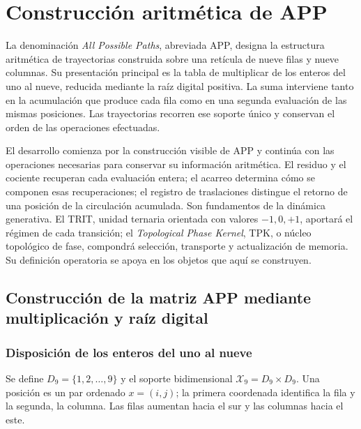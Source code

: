 \section{Construcción aritmética de APP}
\label{app:construccion-explicita}

La denominación \emph{All Possible Paths}, abreviada APP, designa la estructura aritmética de trayectorias construida sobre una retícula de nueve filas y nueve columnas. Su presentación principal es la tabla de multiplicar de los enteros del uno al nueve, reducida mediante la raíz digital positiva. La suma interviene tanto en la acumulación que produce cada fila como en una segunda evaluación de las mismas posiciones. Las trayectorias recorren ese soporte único y conservan el orden de las operaciones efectuadas.

El desarrollo comienza por la construcción visible de APP y continúa con las operaciones necesarias para conservar su información aritmética. El residuo y el cociente recuperan cada evaluación entera; el acarreo determina cómo se componen esas recuperaciones; el registro de traslaciones distingue el retorno de una posición de la circulación acumulada. Son fundamentos de la dinámica generativa. El TRIT, unidad ternaria orientada con valores $-1,0,+1$, aportará el régimen de cada transición; el \emph{Topological Phase Kernel}, TPK, o núcleo topológico de fase, compondrá selección, transporte y actualización de memoria. Su definición operatoria se apoya en los objetos que aquí se construyen.

\subsection{Construcción de la matriz APP mediante multiplicación y raíz digital}
\label{sec:app-soporte}

\subsubsection{Disposición de los enteros del uno al nueve}

\begin{definicion}
\label{def:app-soporte}
Se define $D_9=\{1,2,\ldots,9\}$ y el soporte bidimensional $\mathcal X_9=D_9\times D_9$. Una posición es un par ordenado $x=(i,j)$; la primera coordenada identifica la fila y la segunda, la columna. Las filas aumentan hacia el sur y las columnas hacia el este.
\end{definicion}

